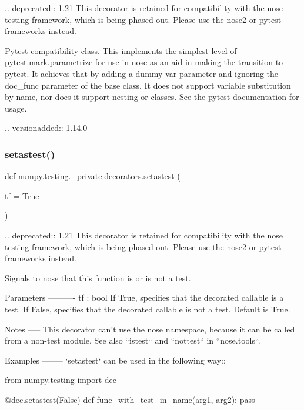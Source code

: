 \begin{DoxyVerb}.. deprecated:: 1.21
    This decorator is retained for compatibility with the nose testing framework, which is being phased out.
    Please use the nose2 or pytest frameworks instead.

Pytest compatibility class. This implements the simplest level of
pytest.mark.parametrize for use in nose as an aid in making the transition
to pytest. It achieves that by adding a dummy var parameter and ignoring
the doc_func parameter of the base class. It does not support variable
substitution by name, nor does it support nesting or classes. See the
pytest documentation for usage.

.. versionadded:: 1.14.0\end{DoxyVerb}
 \mbox{\label{namespacenumpy_1_1testing_1_1__private_1_1decorators_a1507a52f3f465b8f127fe6c639e09d02}} 
\subsubsection{\texorpdfstring{setastest()}{setastest()}}
{\footnotesize\ttfamily def numpy.\+testing.\+\_\+private.\+decorators.\+setastest (\begin{DoxyParamCaption}\item[{}]{tf = {\ttfamily True} }\end{DoxyParamCaption})}

\begin{DoxyVerb}.. deprecated:: 1.21
    This decorator is retained for compatibility with the nose testing framework, which is being phased out.
    Please use the nose2 or pytest frameworks instead.

Signals to nose that this function is or is not a test.

Parameters
----------
tf : bool
    If True, specifies that the decorated callable is a test.
    If False, specifies that the decorated callable is not a test.
    Default is True.

Notes
-----
This decorator can't use the nose namespace, because it can be
called from a non-test module. See also ``istest`` and ``nottest`` in
``nose.tools``.

Examples
--------
`setastest` can be used in the following way::

  from numpy.testing import dec

  @dec.setastest(False)
  def func_with_test_in_name(arg1, arg2):
      pass\end{DoxyVerb}
 \mbox{\label{namespacenumpy_1_1testing_1_1__private_1_1decorators_a959e2eca3bd6bd2d50ab3a1c4d05faa3}} 
